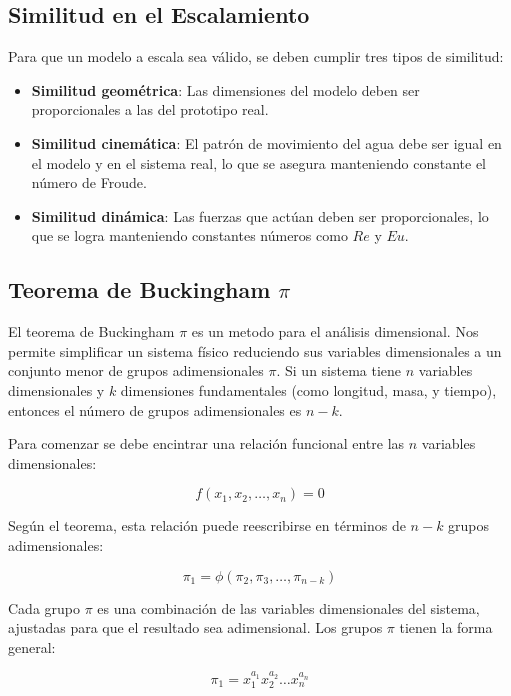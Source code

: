 \subsection{Similitud en el Escalamiento}
Para que un modelo a escala sea válido, se deben cumplir tres tipos de similitud:

\begin{itemize}
    \item \textbf{Similitud geométrica}: Las dimensiones del modelo deben ser proporcionales a las del prototipo real.
    \item \textbf{Similitud cinemática}: El patrón de movimiento del agua debe ser igual en el modelo y en el sistema real, lo que se asegura manteniendo constante el número de Froude.
    \item \textbf{Similitud dinámica}: Las fuerzas que actúan deben ser proporcionales, lo que se logra manteniendo constantes números como $Re$ y $Eu$.
\end{itemize}

\subsection{Teorema de Buckingham $\pi$}

El teorema de Buckingham $\pi$ es un metodo para el análisis dimensional. Nos permite simplificar un sistema físico reduciendo sus variables dimensionales a un conjunto menor de grupos adimensionales $\pi$. Si un sistema tiene $n$ variables dimensionales y $k$ dimensiones fundamentales (como longitud, masa, y tiempo), entonces el número de grupos adimensionales es $n - k$.

Para comenzar se debe encintrar una relación funcional entre las $n$ variables dimensionales:

\begin{equation}
f(x_1, x_2, \ldots, x_n) = 0
\end{equation}

Según el teorema, esta relación puede reescribirse en términos de $n - k$ grupos adimensionales:

\begin{equation}
\pi_1 = \phi(\pi_2, \pi_3, \ldots, \pi_{n-k})
\end{equation}

Cada grupo $\pi$ es una combinación de las variables dimensionales del sistema, ajustadas para que el resultado sea adimensional. Los grupos $\pi$ tienen la forma general:

\begin{equation}
\pi_1 = x_1^{a_1} x_2^{a_2} \ldots x_n^{a_n}
\end{equation}

